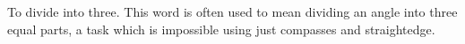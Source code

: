 To divide into three. This word is often used to mean
dividing an angle into three equal parts, a task which is
impossible using just compasses and straightedge.